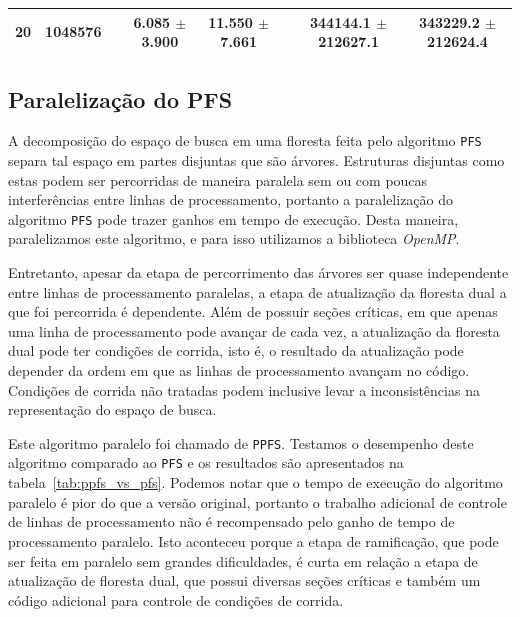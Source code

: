 \documentclass[12pt]{article}
\newcommand{\toolname}[1]{\textit{#1}}
\newcommand{\algname}[1]{\texttt{#1}}
\begin{document}
\begin{table}
\begin{tabular}{cc c cc c cc}
20 & 1048576 &&  6.085 $\pm$ 3.900 & 11.550 $\pm$ 7.661 &&  344144.1 $\pm$ 212627.1 & 343229.2 $\pm$ 212624.4 \\
\bottomrule 
\end{tabular}%
\end{table}


\subsection{Paralelização do PFS}
A decomposição do espaço de busca em uma floresta feita pelo algoritmo
\algname{PFS} separa tal espaço em partes disjuntas que são árvores.
Estruturas disjuntas como estas podem ser percorridas de maneira 
paralela sem ou com poucas interferências entre linhas de processamento,
portanto a paralelização do algoritmo \algname{PFS} pode trazer ganhos 
em tempo de execução. Desta maneira, paralelizamos este algoritmo, e 
para isso utilizamos a biblioteca \toolname{OpenMP}.

Entretanto, apesar da etapa de percorrimento das árvores ser quase 
independente entre linhas de processamento paralelas, a etapa de 
atualização da floresta dual a que foi percorrida é dependente. Além
de possuir seções críticas, em que apenas uma linha de processamento 
pode avançar de cada vez, a atualização da floresta dual pode ter
condições de corrida, isto é, o resultado da atualização pode depender
da ordem em que as linhas de processamento avançam no código. Condições
de corrida não tratadas podem inclusive levar a inconsistências na
representação do espaço de busca.

Este algoritmo paralelo foi chamado de \algname{PPFS}. Testamos o 
desempenho deste algoritmo comparado ao \algname{PFS} e os resultados
são apresentados na tabela~\ref{tab:ppfs_vs_pfs}. Podemos notar que o
tempo de execução do algoritmo paralelo é pior do que a versão original,
portanto o trabalho adicional de controle de linhas de processamento
não é recompensado pelo ganho de tempo de processamento paralelo. Isto
aconteceu porque a etapa de ramificação, que pode ser feita em paralelo
sem grandes dificuldades, é curta em relação a etapa de atualização de
floresta dual, que possui diversas seções críticas e também um código
adicional para controle de condições de corrida.
\end{document}
